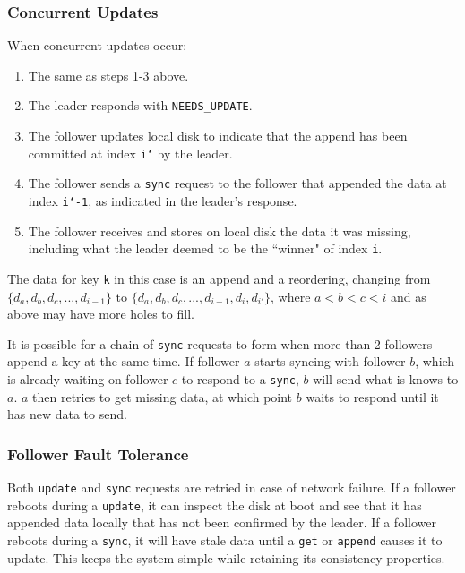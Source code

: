 \documentclass[11pt,english,twocolumn]{article}
\begin{document}
\subsubsection{Concurrent Updates}
When concurrent updates occur:

\begin{enumerate}
	\item The same as steps 1-3 above.
	\item The leader responds with \texttt{NEEDS\_UPDATE}.
	\item The follower updates local disk to indicate that the append has
		been committed at index \texttt{i`} by the leader.
	\item The follower sends a \texttt{sync} request to the follower that
		appended the data at index \texttt{i`-1}, as indicated in the
		leader's response.
	\item The follower receives and stores on local disk the data it was
		missing, including what the leader deemed to be the ``winner" of
		index \texttt{i}.
\end{enumerate}

The data for key \texttt{k} in this case is an append and a reordering,
changing from $\{d_a, d_b, d_c, ..., d_{i-1}\}$ to $\{d_a, d_b, d_c, ...,
d_{i-1}, d_i, d_{i'}\}$, where $a < b < c < i$ and as above may have more holes
to fill.

It is possible for a chain of \texttt{sync} requests to form when more than 2
followers append a key at the same time. If follower $a$ starts syncing with
follower $b$, which is already waiting on follower $c$ to respond to a
\texttt{sync}, $b$ will send what is knows to $a$. $a$ then retries to get
missing data, at which point $b$ waits to respond until it has new data to send.

\subsubsection{Follower Fault Tolerance}
Both \texttt{update} and \texttt{sync} requests are retried in case of network
failure. If a follower reboots during a \texttt{update}, it can inspect the disk
at boot and see that it has appended data locally that has not been confirmed by
the leader. If a follower reboots during a \texttt{sync}, it will have stale
data until a \texttt{get} or \texttt{append} causes it to update. This keeps the
system simple while retaining its consistency properties.
\end{document}
